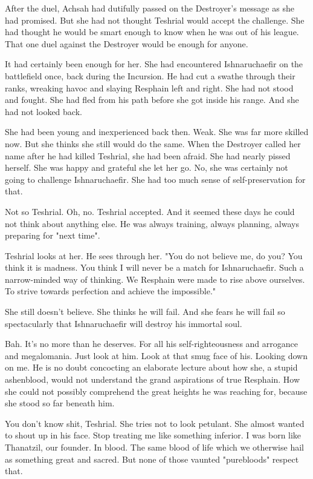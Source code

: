After the duel, Achsah had dutifully passed on the Destroyer's message as she had promised. 
But she had not thought Teshrial would accept the challenge. 
She had thought he would be smart enough to know when he was out of his league. 
That one duel against the Destroyer would be enough for anyone. 

It had certainly been enough for her. 
She had encountered Ishnaruchaefir on the battlefield once, back during the Incursion. 
He had cut a swathe through their ranks, wreaking havoc and slaying Resphain left and right. 
She had not stood and fought. 
She had fled from his path before she got inside his range. 
And she had not looked back. 

She had been young and inexperienced back then. 
Weak. 
She was far more skilled now. 
But she thinks she still would do the same. 
When the Destroyer called her name after he had killed Teshrial, she had been afraid. 
She had nearly pissed herself. 
She was happy and grateful she let her go.
No, she was certainly not going to challenge Ishnaruchaefir. 
She had too much sense of self-preservation for that. 

Not so Teshrial. 
Oh, no. 
Teshrial accepted.
And it seemed these days he could not think about anything else. 
He was always training, always planning, always preparing for "next time". 

Teshrial looks at her.
He sees through her. 
"You do not believe me, do you?
 You think it is madness. 
 You think I will never be a match for Ishnaruchaefir. 
 Such a narrow-minded way of thinking. 
 We Resphain were made to rise above ourselves. 
 To strive towards perfection and achieve the impossible."

She still doesn't believe. 
She thinks he will fail. 
And she fears he will fail so spectacularly that Ishnaruchaefir will destroy his immortal soul. 

Bah.
It's no more than he deserves. 
For all his self-righteousness and arrogance and megalomania. 
Just look at him. 
Look at that smug face of his. 
Looking down on me. 
He is no doubt concocting an elaborate lecture about how she, a stupid ashenblood, would not understand the grand aspirations of true Resphain. 
How she could not possibly comprehend the great heights he was reaching for, because she stood so far beneath him. 

You don't know shit, Teshrial.
She tries not to look petulant. 
She almost wanted to shout up in his face. 
Stop treating me like something inferior. 
I was born like Thanatzil, our founder. 
In blood. 
The same blood of life which we otherwise hail as something great and sacred. 
But none of those vaunted "purebloods" respect that. 

